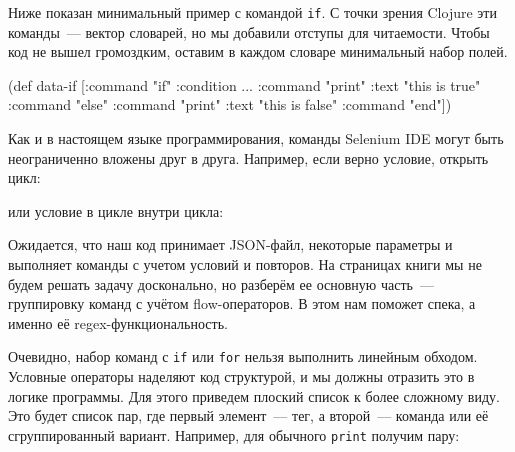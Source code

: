Ниже показан минимальный пример с командой \texttt{if}. С точки зрения Clojure
эти команды~--- вектор словарей, но мы добавили отступы для читаемости. Чтобы
код не вышел громоздким, оставим в каждом словаре минимальный набор полей.

\begin{english}
  \begin{clojure}
(def data-if
  [{:command "if" :condition ...}
     {:command "print" :text "this is true"}
   {:command "else"}
     {:command "print" :text "this is false"}
   {:command "end"}])
  \end{clojure}
\end{english}

Как и в настоящем языке программирования, команды Selenium IDE могут быть
неограниченно вложены друг в друга. Например, если верно условие, открыть цикл:

\begin{english}
  \begin{clojure}
  \end{clojure}
\end{english}

\noindent
или условие в цикле внутри цикла:

\begin{english}
  \begin{clojure}
  \end{clojure}
\end{english}

Ожидается, что наш код принимает JSON-файл, некоторые параметры и выполняет
команды с учетом условий и повторов. На страницах книги мы не будем решать
задачу досконально, но разберём ее основную часть~--- группировку команд с
учётом flow-операторов. В этом нам поможет спека, а именно её
regex-функциональность.


Очевидно, набор команд с \texttt{if} или \texttt{for} нельзя выполнить линейным
обходом. Условные операторы наделяют код структурой, и мы должны отразить это в
логике программы. Для этого приведем плоский список к более сложному виду. Это
будет список пар, где первый элемент~--- тег, а второй~--- команда или её
сгруппированный вариант. Например, для обычного \texttt{print} получим пару:

